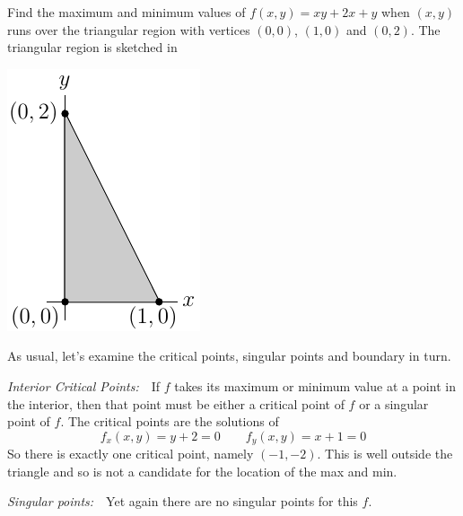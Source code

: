 \begin{eg}\label{eg:MXMNabsCC}
Find the maximum and minimum values of $f(x,y)=xy+2x+y$ when $(x,y)$
runs over the triangular region with vertices $(0,0)$, $(1,0)$ and
$(0,2)$. The triangular region is sketched in 
\begin{efig}
\begin{center}
   \includegraphics{optExampleCCa}
\end{center}
\end{efig}
\goodbreak

\soln 
As usual, let's examine the critical points, singular points and boundary
in turn.

\noindent\emph{Interior Critical Points:}\ \ 
If $f$ takes its maximum or minimum value at a point in the interior, 
then that point must be either a critical point of $f$ or a singular point of $f$.
The critical points are the solutions of
\begin{equation*}
f_x(x,y)=y+2=0\qquad
f_y(x,y)=x+1=0
\end{equation*}
So there is exactly one critical point, namely $(-1,-2)$. This is well outside
the triangle and so is not a candidate for the location of the max and min.

\smallskip
\noindent\emph{Singular points:}\ \  Yet again there are no singular 
points for this $f$.


\end{eg}
